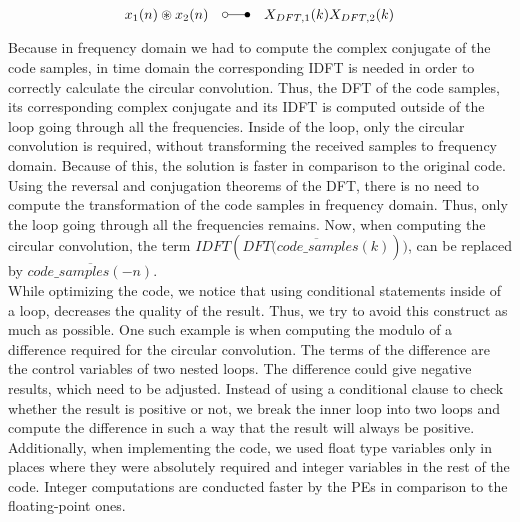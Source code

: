 			\begin{equation} 
				\label{eq:circular_conv}
				x_{1}(n) \circledast x_{2}(n)\quad \laplace\quad X_{DFT,1}(k)X_{DFT,2}(k)
			\end{equation} 

			Because in frequency domain we had to compute the complex conjugate of the code samples, in time domain the corresponding IDFT is needed in order to correctly calculate the circular convolution. Thus, the DFT of the code samples, its corresponding complex conjugate and its IDFT is computed outside of the loop going through all the frequencies. Inside of the loop, only the circular convolution is required, without transforming the received samples to frequency domain. Because of this, the solution is faster in comparison to the original code.\\
			Using the reversal and conjugation theorems of the DFT, there is no need to compute the transformation of the code samples in frequency domain. Thus, only the loop going through all the frequencies remains. Now, when computing the circular convolution, the term $IDFT(\overline{DFT(code\_samples(k)}))$, can be replaced by $\overline{code\_samples(-n)}$.\\ 
			While optimizing the code, we notice that using conditional statements inside of a loop, decreases the quality of the result. Thus, we try to avoid this construct as much as possible. One such example is when computing the modulo of a difference required for the circular convolution. The terms of the difference are the control variables of two nested loops. The difference could give negative results, which need to be adjusted. Instead of using a conditional clause to check whether the result is positive or not, we break the inner loop into two loops and compute the difference in such a way that the result will always be positive.\\
			Additionally, when implementing the code, we used float type variables only in places where they were absolutely required and integer variables in the rest of the code. Integer computations are conducted faster by the PEs in comparison to the floating-point ones. 
	
